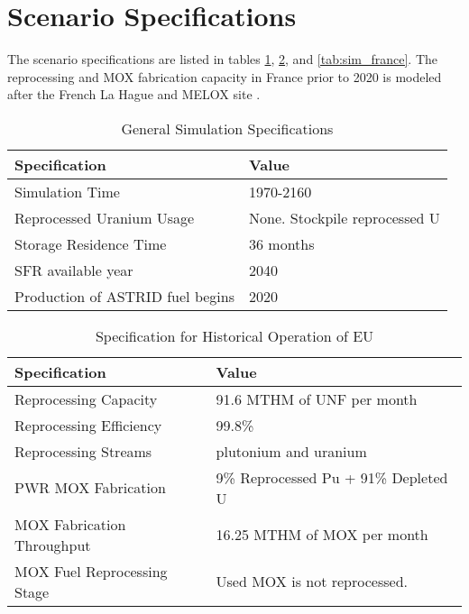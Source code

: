 \section{Scenario Specifications}

The scenario specifications  are
listed in tables \ref{tab:gen}, \ref{tab:sim_eu}, and \ref{tab:sim_france}.
The reprocessing and \gls{MOX} fabrication capacity in France
prior to 2020 is modeled after the 
French La Hague and MELOX site \cite{schneider_spent_2008, hugelmann_melox_1999}.


\begin{table}[h]
    \centering
    \begin{tabularx}{\textwidth}{bb}
        \hline
        \textbf{Specification} &\textbf{ Value} \\
        \hline
        Simulation Time & 1970-2160 \\ 
        Reprocessed Uranium Usage &  None. Stockpile reprocessed U \\
        Storage Residence Time & 36 months \\
        \gls{SFR} available year & 2040 \\
        Production of \gls{ASTRID} fuel begins & 2020 \\
        \hline
    \end{tabularx}
    \caption {General Simulation Specifications}
    \label{tab:gen}
\end{table}

\begin{table}[h]
	\centering
	\begin{tabularx}{\textwidth}{bb}
		\hline
		\textbf{Specification} &\textbf{ Value} \\
		\hline
		Reprocessing Capacity & 91.6 MTHM of \gls{UNF} per month \cite{schneider_spent_2008} \\
		Reprocessing Efficiency & 99.8\% \\
		Reprocessing Streams & plutonium and uranium \\
		\gls{PWR} \gls{MOX} Fabrication & \small{9\% Reprocessed Pu + 91\% Depleted U} \\
		\gls{MOX} Fabrication Throughput & 16.25 MTHM of \gls{MOX} per month  \cite{hugelmann_melox_1999} \\
		\gls{MOX} Fuel Reprocessing Stage &  Used \gls{MOX} is not reprocessed. \\  
		\hline
	\end{tabularx}
	\caption {Specification for Historical Operation of \gls{EU}}
	\label{tab:sim_eu}
\end{table}

